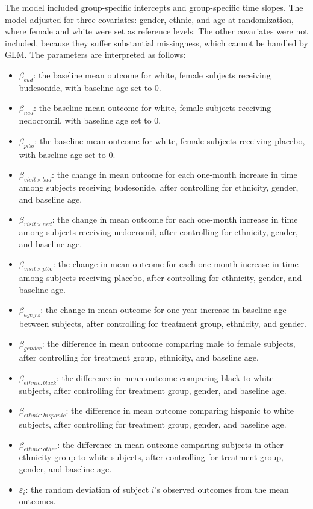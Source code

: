 \documentclass[12pt]{article}
\begin{document}
The model included group-specific intercepts and
group-specific time slopes. The model adjusted for
three covariates: gender, ethnic, and age at randomization,
where female and white were set as reference levels.
The other covariates were not included, because they suffer
substantial missingness, which cannot be handled by
GLM.
The parameters are interpreted as follows:
\begin{itemize}
  \item $\beta_{bud}$: the baseline mean outcome for white, female subjects receiving budesonide, with baseline age set to 0.
  \item $\beta_{ned}$: the baseline mean outcome for white, female subjects receiving nedocromil, with baseline age set to 0.
  \item $\beta_{plbo}$: the baseline mean outcome for white, female subjects receiving placebo, with baseline age set to 0.
  \item $\beta_{visit \times bud}$: the change in mean outcome for each one-month increase in time among subjects receiving budesonide, after controlling for ethnicity, gender, and baseline age.
  \item $\beta_{visit \times ned}$: the change in mean outcome for each one-month increase in time among subjects receiving nedocromil, after controlling for ethnicity, gender, and baseline age.
  \item $\beta_{visit \times plbo}$: the change in mean outcome for each one-month increase in time among subjects receiving placebo, after controlling for ethnicity, gender, and baseline age.
  \item $\beta_{age\_rz}$: the change in mean outcome for one-year increase in baseline age between subjects, after controlling for treatment group, ethnicity, and gender.
  \item $\beta_{gender}$: the difference in mean outcome comparing male to female subjects, after controlling for treatment group, ethnicity, and baseline age.
  \item $\beta_{ethnic:black}$: the difference in mean outcome comparing black to white subjects, after controlling for treatment group, gender, and baseline age.
  \item $\beta_{ethnic:hispanic}$: the difference in mean outcome comparing hispanic to white subjects, after controlling for treatment group, gender, and baseline age.
  \item $\beta_{ethnic:other}$: the difference in mean outcome comparing subjects in other ethnicity group to white subjects, after controlling for treatment group, gender, and baseline age.
  \item $\varepsilon_i$: the random deviation of subject $i$'s observed outcomes from the mean outcomes.
\end{itemize}
\end{document}
